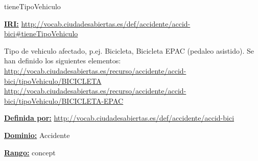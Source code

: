 \begin{mybox}{tieneTipoVehiculo}
\begin{flushleft}
\underline{\textbf{IRI:}}
\url{http://vocab.ciudadesabiertas.es/def/accidente/accid-bici#tieneTipoVehiculo}
\newline

Tipo de vehiculo afectado, p.ej. Bicicleta, Bicicleta EPAC (pedaleo asistido). Se han definido los siguientes elementos:
\newline \url{http://vocab.ciudadesabiertas.es/recurso/accidente/accid-bici/tipoVehiculo/BICICLETA}
\newline \url{http://vocab.ciudadesabiertas.es/recurso/accidente/accid-bici/tipoVehiculo/BICICLETA-EPAC}
\newline

\underline{\textbf{Definida por:}}
\url{http://vocab.ciudadesabiertas.es/def/accidente/accid-bici}
\newline

\underline{\textbf{Dominio:}}
\newline Accidente
\newline

\underline{\textbf{Rango:}}
\newline concept
\newline

\end{flushleft}
\end{mybox}



